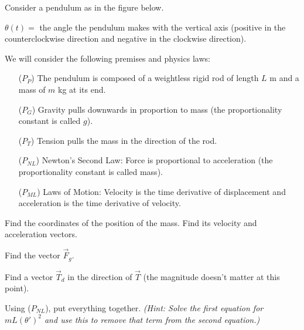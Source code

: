 \documentclass{workbook}
\begin{document}
\begin{slide}
	
\question

Consider a pendulum as in the figure below.

\begin{multicols}{2}
\begin{center}
\end{center}

\columnbreak
$\theta(t) = $ the angle the pendulum makes with the vertical axis (positive in the counterclockwise direction and negative in the clockwise direction).
\end{multicols}

We will consider the following premises and physics laws:

\begin{itemize}
	\item[($P_P$)] The pendulum is composed of a weightless rigid rod of length $L$ m and a mass of $m$ kg at its end.
	\item[($P_G$)] Gravity pulls downwards in proportion to mass (the proportionality constant is called $g$).
	\item[($P_T$)] Tension pulls the mass in the direction of the rod.
	\item[($P_{NL}$)] Newton's Second Law: Force is proportional to acceleration (the proportionality constant is called mass).
	\item[($P_{ML}$)] Laws of Motion: Velocity is the time derivative of displacement and acceleration is the time derivative of velocity.
\end{itemize}

\begin{parts}
	\item Find the coordinates of the position of the mass. Find its velocity and acceleration vectors.
	\item Find the vector $\vec{F}_g$.
	\item Find a vector $\vec{T}_d$ in the direction of $\vec{T}$ (the magnitude doesn't matter at this point).
	\item Using ($P_{NL}$), put everything together.	 \textit{(Hint: Solve the first equation for $mL(\theta')^2$ and use this to remove that term from the second equation.)}

\end{parts}
\end{slide}
\end{document}
